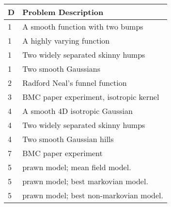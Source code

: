 \begin{table}[h!]
\label{tbl:problem_descriptions}
\begin{center}
\begin{tabular}{ll}
 D & Problem Description \ 
 \\ \midrule 
1 & A smooth function with two bumps \\ 
1 & A highly varying function \\ 
1 & Two widely separated skinny humps \\ 
1 & Two smooth Gaussians \\ 
2 & Radford Neal's funnel function \\ 
3 & BMC paper experiment, isotropic kernel \\ 
4 & A smooth 4D isotropic Gaussian \\ 
4 & Two widely separated skinny humps \\ 
4 & Two smooth Gaussian hills \\ 
7 & BMC paper experiment \\ 
5 & prawn model; mean field model. \\ 
5 & prawn model; best markovian model. \\ 
5 & prawn model; best non-markovian model. \\ 
\end{tabular}
\end{center}
\end{table}
